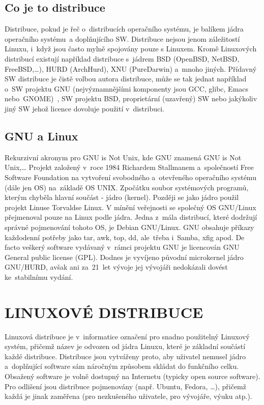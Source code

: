 \documentclass[a4paper,12pt]{article}
\newcommand{\upc}[1]{\uppercase{#1}} %
\begin{document}
\subsection{Co je to distribuce}
Distribuce, pokud je řeč o~distribucích operačního systému, je balíkem jádra operačního systému~a doplňujícího SW. Distribuce nejsou jenom záležitostí Linuxu, i~když jsou často mylně spojovány pouze s Linuxem. Kromě Linuxových distribucí existují například distribuce s~jádrem BSD (OpenBSD, NetBSD, FreeBSD,…), HURD (ArchHurd), XNU (PureDarwin) a~mnoho jiných. Přídavný SW distribuce je čistě volbou autora distribuce, může se tak jednat například o~SW projektu GNU (nejvýznamnějšími komponenty jsou GCC, glibc, Emacs nebo~GNOME)~\cite{GNUweb}, SW projektu BSD, proprietární (uzavřený) SW nebo jakýkoliv jiný SW jehož licence dovoluje použití v~distribuci.

\subsection{GNU a Linux} 
Rekurzivní akronym pro GNU is Not Unix, kde GNU znamená GNU is Not Unix,…
Projekt založený v~roce 1984 Richardem Stallmanem a~společností Free Software Foundation na vytvoření svobodného a~otevřeného operačního systému (dále jen OS) na~základě OS UNIX. Zpočátku soubor systémových programů, kterým chyběla hlavní součást - jádro (kernel). Později se jako jádro použil projekt Linuse Torvaldse Linux. V mínění veřejnosti se společný OS GNU/Linux přejmenoval pouze na Linux podle jádra. Jedna z~mála distribucí, které dodržují správné pojmenování tohoto OS, je Debian GNU/Linux.
GNU obsahuje příkazy každodenní potřeby jako tar, awk, top, dd, ale~třeba i~Samba, xfig apod. De facto veškerý software vydávaný v~rámci projektu GNU je licencován GNU General public license (GPL). Dodnes je vyvíjeno původní microkernel jádro GNU/HURD, avšak ani za~21~let vývoje jej vývojáři nedokázali dovést ke~stabilnímu vydání.~\cite{GNUABCLinuxu}~\cite{GNUweb}~\cite{ROOT_HURD}


\section{\upc{Linuxové distribuce}}
Linuxová distribuce je v~informatice označení pro snadno použitelný Linuxový systém, přičemž název je odvozen od jádra Linuxu, které je základní součástí každé distribuce. Distribuce jsou vytvářeny proto, aby uživatel nemusel jádro a~doplňující software sám náročným způsobem skládat do funkčního celku. Obsažený software je volně dostupný na Internetu (typicky open source software). Pro odlišení jsou distribuce pojmenovány (např. Ubuntu, Fedora, …), přičemž každá je jinak zaměřena (pro nezkušeného uživatele, pro vývojáře, výuku atp.).\cite{WDIST}
\end{document}
